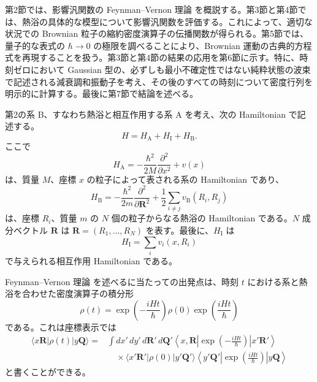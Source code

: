 第2節では、影響汎関数の Feynman--Vernon 理論\cite{ref22,ref23} を概説する。第3節と第4節では、熱浴の具体的な模型について影響汎関数を評価する。これによって、適切な状況での Brownian 粒子の縮約密度演算子の伝播関数が得られる。第5節では、量子的な表式の $\hbar\to0$ の極限を調べることにより、Brownian 運動の古典的方程式を再現することを扱う。第3節と第4節の結果の応用を第6節に示す。特に、時刻ゼロにおいて Gaussian 型の、必ずしも最小不確定性ではない純粋状態の波束で記述される減衰調和振動子を考え、その後のすべての時刻について密度行列を明示的に計算する。最後に第7節で結論を述べる。


第2の系 B、すなわち熱浴と相互作用する系 A を考え、次の Hamiltonian で記述する。
\begin{equation}
 H=H_{\mathrm A}+H_{\mathrm I}+H_{\mathrm B}.
 \tag{2.1}\label{eq:2.1}
\end{equation}
ここで
\begin{equation}
 H_{\mathrm A}=-\frac{\hbar^2}{2M}\frac{\partial^2}{\partial x^2}+v(x)
 \tag{2.2}\label{eq:2.2}
\end{equation}
は、質量 $M$、座標 $x$ の粒子によって表される系の Hamiltonian であり、
\begin{equation}
 H_{\mathrm B}=-\frac{\hbar^2}{2m}\frac{\partial^2}{\partial\bm R^2}
 +\frac12\sum_{i\ne j}v_{\mathrm B}(R_i,R_j)
 \tag{2.3}\label{eq:2.3}
\end{equation}
は、座標 $R_i$、質量 $m$ の $N$ 個の粒子からなる熱浴の Hamiltonian である。$N$ 成分ベクトル $\bm R$ は $\bm R=(R_1,\ldots,R_N)$ を表す。最後に、$H_{\mathrm I}$ は
\begin{equation}
 H_{\mathrm I}=\sum_i v_i(x,R_i)
 \tag{2.4}\label{eq:2.4}
\end{equation}
で与えられる相互作用 Hamiltonian である。

Feynman--Vernon 理論\cite{ref22,ref23} を述べるに当たっての出発点は、時刻 $t$ における系と熱浴を合わせた密度演算子の積分形
\begin{equation}
 \rho(t)=\exp\left(-\frac{iHt}{\hbar}\right)\rho(0)
 \exp\left(\frac{iHt}{\hbar}\right)
 \tag{2.5}\label{eq:2.5}
\end{equation}
である。これは座標表示では
\begin{equation}
 \begin{aligned}
 \langle x\bm R|\rho(t)|y\bm Q\rangle
 ={}&\int dx'\,dy'\,d\bm R'\,d\bm Q'
 \left\langle x,\bm R\left|\exp\left(-\frac{iHt}{\hbar}\right)\right|x'\bm R'\right\rangle\\
 &\quad\times\langle x'\bm R'|\rho(0)|y'\bm Q'\rangle
 \left\langle y'\bm Q'\left|\exp\left(\frac{iHt}{\hbar}\right)\right|y\bm Q\right\rangle
 \end{aligned}
 \tag{2.6}\label{eq:2.6}
\end{equation}
と書くことができる。

